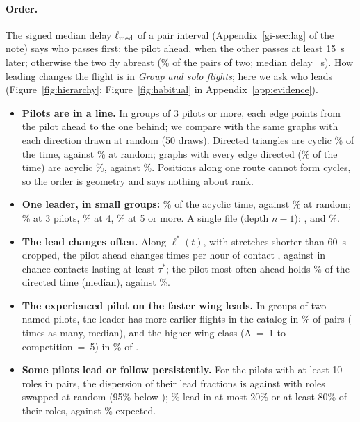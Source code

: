 \paragraph{Order.} The signed median delay $\ell_{\rm med}$ of a pair interval
(Appendix~\ref{gi-sec:lag} of the note) says who passes first: the pilot ahead, when the other passes at least
15~s later; otherwise the two fly abreast (\Abreast\% of the pairs of two; median delay
\DelayMedian~s). How leading changes the flight is in \emph{Group and solo flights}; here we ask
who leads (Figure~\ref{fig:hierarchy}; Figure~\ref{fig:habitual} in Appendix~\ref{app:evidence}).
\begin{itemize}
  \item \textbf{Pilots are in a line.} In groups of 3 pilots or more, each edge points from
        the pilot ahead to the one behind; we compare with the same graphs with each direction drawn
        at random (50 draws). Directed triangles are cyclic \StCyclic\% \StCyclicBand{} of the time,
        against \StCyclicNull\% at random; graphs with every edge directed (\StFullShare\% of the time)
        are acyclic \StAcyclic\%, against \StAcyclicNull\%. Positions along one route cannot form
        cycles, so the order is geometry and says nothing about rank.
  \item \textbf{One leader, in small groups:} \StOneLeader\% \StOneLeaderBand{} of the acyclic time,
        against \StOneLeaderNull\% \StOneLeaderNullBand{} at random; \StOneLeaderThree\% at 3 pilots,
        \StOneLeaderFour\% at 4, \StOneLeaderFive\% at 5 or more. A single file (depth $n-1$):
        \StLineThree, \StLineFour{} and \StLineFive\%.
  \item \textbf{The lead changes often.} Along $\ell^*(t)$, with stretches shorter than 60~s dropped,
        the pilot ahead changes \StSwitches{} times per hour of contact \StSwitchesBand{}, against
        \StSwitchesChance{} \StSwitchesChanceBand{} in chance contacts lasting at least $\tau^*$; the
        pilot most often ahead holds \StDominant\% of the directed time (median), against
        \StDominantChance\%.
  \item \textbf{The experienced pilot on the faster wing leads.} In groups of two named
        pilots, the leader has more earlier flights in the catalog in \StExp\% \StExpBand{} of
        \StExpPairs{} pairs (\StExpRatio{} times as many, median), and the higher wing class (A~=~1 to
        competition~=~5) in \StWing\% \StWingBand{} of \StWingPairs.
  \item \textbf{Some pilots lead or follow persistently.} For the \HabitualPilots{} pilots with at
        least 10 roles in pairs, the dispersion of their lead fractions is \HabitualDispersion{}
        against \HabitualNull{} with roles swapped at random (95\% below \HabitualNullHigh);
        \HabitualExtreme\% lead in at most 20\% or at least 80\% of their roles, against
        \HabitualExtremeNull\% expected.
\end{itemize}

